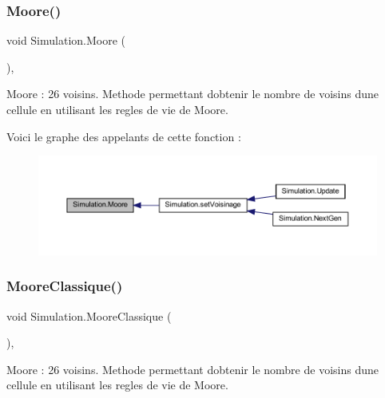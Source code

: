 \subsubsection{\texorpdfstring{Moore()}{Moore()}}
{\footnotesize\ttfamily void Simulation.\+Moore (\begin{DoxyParamCaption}{ }\end{DoxyParamCaption})\hspace{0.3cm}{\ttfamily [inline]}, {\ttfamily [private]}}



Moore \+: 26 voisins. Methode permettant d\textquotesingle{}obtenir le nombre de voisins d\textquotesingle{}une cellule en utilisant les regles de vie de Moore. 

Voici le graphe des appelants de cette fonction \+:\nopagebreak
\begin{figure}[H]
\begin{center}
\leavevmode
\includegraphics[width=350pt]{class_simulation_aad224ef6c13fac45281cf6c095c5c874_icgraph}
\end{center}
\end{figure}
\mbox{\label{class_simulation_a39f92768aa24cee944387315749314ad}} 
\subsubsection{\texorpdfstring{Moore\+Classique()}{MooreClassique()}}
{\footnotesize\ttfamily void Simulation.\+Moore\+Classique (\begin{DoxyParamCaption}{ }\end{DoxyParamCaption})\hspace{0.3cm}{\ttfamily [inline]}, {\ttfamily [private]}}



Moore \+: 26 voisins. Methode permettant d\textquotesingle{}obtenir le nombre de voisins d\textquotesingle{}une cellule en utilisant les regles de vie de Moore. 

